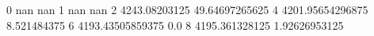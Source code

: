 0 nan nan
1 nan nan
2 4243.08203125 49.64697265625
4 4201.95654296875 8.521484375
6 4193.43505859375 0.0
8 4195.361328125 1.92626953125
